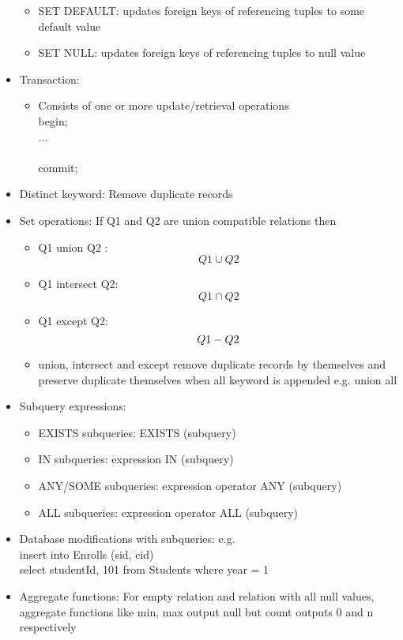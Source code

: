 \documentclass[10pt,landscape,a4paper]{scrartcl}
\begin{document}
\begin{multicols*}{4}
\begin{itemize}
\begin{itemize}
          \item SET DEFAULT: updates foreign keys of referencing tuples to some default value
          \item SET NULL: updates foreign keys of referencing tuples to null value
      \end{itemize}
      \item Transaction:
      \begin{itemize}
          \item Consists of one or more update/retrieval operations \\
          begin; \\
          ... \\ \\
          commit;
      \end{itemize}
      \item Distinct keyword: Remove duplicate records
      \item Set operations: If Q1 and Q2 are union compatible relations then
      \begin{itemize}
          \item Q1 union Q2 : $$Q1 \cup Q2$$
          \item Q1 intersect Q2: $$Q1 \cap Q2$$
          \item Q1 except Q2: $$Q1 \-- Q2$$
          \item union, intersect and except remove duplicate records by themselves and preserve duplicate themselves when all keyword is appended e.g. union all     
      \end{itemize}
      \item Subquery expressions: 
      \begin{itemize}
          \item EXISTS subqueries: EXISTS (subquery)
          \item IN subqueries: expression IN (subquery)
          \item ANY/SOME subqueries: expression operator ANY (subquery)
          \item ALL subqueries: expression operator ALL (subquery)
      \end{itemize}
      \item Database modifications with subqueries: e.g. \\ insert into Enrolls (sid, cid) \\ select studentId, 101 from Students where year = 1
      \item Aggregate functions: For empty relation and relation with all null values, aggregate functions like min, max output null but count outputs 0 and n respectively

\end{itemize}
\end{multicols*}
\end{document}

